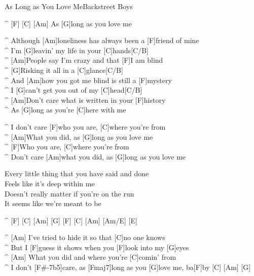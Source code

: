 \begin{song}{As Long as You Love Me}{Backstreet Boys}

\begin{guitar}
^ [F]   [C]  [Am]   As [G]long as you love me\\
\end{guitar}

\begin{guitar}
^ Although [Am]loneliness has always been a [F]friend of mine\\
^ I'm [G]leavin' my life in your [C]hands[C/B]\\
^ [Am]People say I'm crazy and that [F]I am blind\\
^ [G]Risking it all in a [C]glance[C/B]\\
^ And [Am]how you got me blind is still a [F]mystery\\
^ I [G]can't get you out of my [C]head[C/B]\\
^ [Am]Don't care what is written in your [F]history\\
^ As [G]long as you're [C]here with me\\
\end{guitar}

\begin{guitar}
^ I don't care [F]who you are, [C]where you're from\\
^ [Am]What you did, as [G]long as you love me\\
^ [F]Who you are, [C]where you're from\\
^ Don't care [Am]what you did, as [G]long as you love me\\
\end{guitar}


\begin{guitar}
Every little thing that you have said and done\\
Feels like it's deep within me\\
Doesn't really matter if you're on the run\\
It seems like we're meant to be\\
\end{guitar}



\begin{guitar}
^ [F] [C] [Am] [G] [F] [C] [Am] [Am/E] [E]\\

\end{guitar}
\begin{guitar}
^ [Am]   I've tried to hide it so that [C]no one knows\\
^ But I [F]guess it shows when you [F]look into my [G]eyes\\
^ [Am]   What you did and where you're [C]comin' from\\
^ I don't [F#-7b5]care, as [Fmaj7]long as you [G]love me, ba[F]by [C] [Am] [G]\\
\end{guitar}


\end{song}
